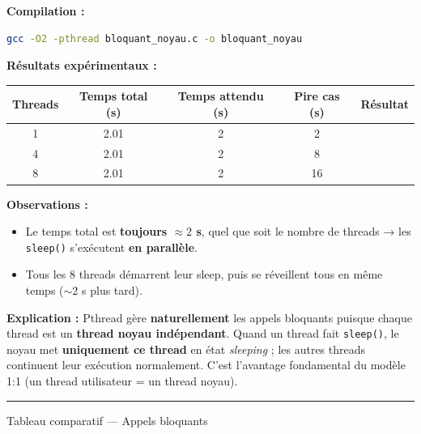 \documentclass[11pt,a4paper]{article}
\newcommand{\cmark}{\ding{51}}
\let\oldtexttt\texttt
\renewcommand{\texttt}[1]{\oldtexttt{\color{keyword}#1}}
\begin{document}
\textbf{Compilation :}
\begin{lstlisting}[language=bash]
gcc -O2 -pthread bloquant_noyau.c -o bloquant_noyau
\end{lstlisting}

\textbf{Résultats expérimentaux :}
\begin{center}
\begin{tabular}{|c|c|c|c|c|}
\hline
\textbf{Threads} & \textbf{Temps total (s)} & \textbf{Temps attendu (s)} & \textbf{Pire cas (s)} & \textbf{Résultat} \\
\hline
1 & 2.01 & 2 & 2 & \cmark \\
\hline
4 & 2.01 & 2 & 8 & \cmark \\
\hline
8 & 2.01 & 2 & 16 & \cmark \\
\hline
\end{tabular}
\end{center}

\textbf{Observations :}
\begin{itemize}
  \item Le temps total est \textbf{toujours \(\approx 2\) s}, quel que soit le nombre de threads → les \texttt{sleep()} s'exécutent \textbf{en parallèle}.
  \item Tous les 8 threads démarrent leur sleep, puis se réveillent tous en même temps (\(\sim 2\) s plus tard).
\end{itemize}

\textbf{Explication :} Pthread gère \textbf{naturellement} les appels bloquants puisque chaque thread est un \textbf{thread noyau indépendant}. Quand un thread fait \texttt{sleep()}, le noyau met \textbf{uniquement ce thread} en état \emph{sleeping} ; les autres threads continuent leur exécution normalement. C'est l'avantage fondamental du modèle 1:1 (un thread utilisateur = un thread noyau).

\bigskip
\hrule
\bigskip

{Tableau comparatif — Appels bloquants}
\end{document}
